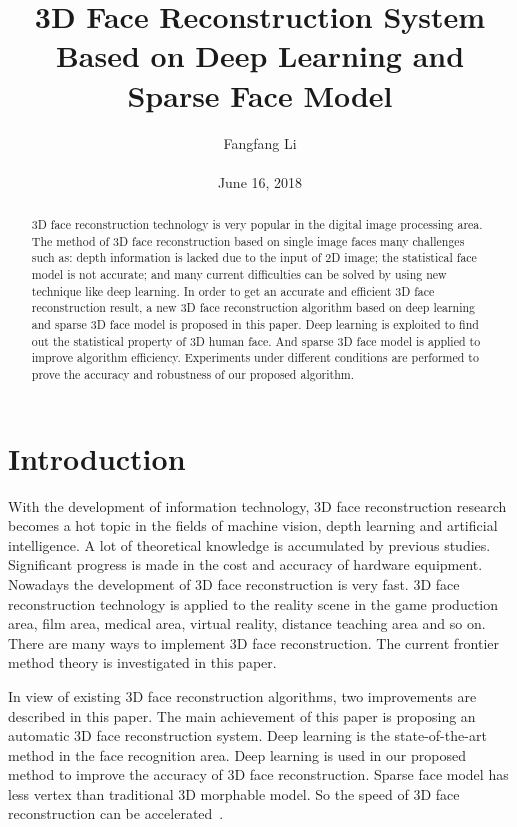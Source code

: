 \documentclass[10pt,twocolumn,letterpaper]{article}
\begin{document}
\title{\textbf{3D Face Reconstruction System Based on Deep Learning and Sparse Face Model }}
\author{Fangfang Li\\\\June 16, 2018}
\maketitle
\begin{abstract}
3D face reconstruction technology is very popular in the digital image processing area. The method of 3D face reconstruction based on single image faces many challenges such as: depth information is lacked due to the input of 2D image; the statistical face model is not accurate; and many current difficulties can be solved by using new technique like deep learning. In order to get an accurate and efficient 3D face reconstruction result, a new 3D face reconstruction algorithm based on deep learning and sparse 3D face model is proposed in this paper. Deep learning is exploited to find out the statistical property of 3D human face. And sparse 3D face model is applied to improve algorithm efficiency. Experiments under different conditions are performed to prove the accuracy and robustness of our proposed algorithm.
\end{abstract}
\section{Introduction}
With the development of information technology, 3D face reconstruction research becomes a hot topic in the fields of machine vision, depth learning and artificial intelligence. A lot of theoretical knowledge is accumulated by previous studies. Significant progress is made in the cost and accuracy of hardware equipment. Nowadays the development of 3D face reconstruction is very fast. 3D face reconstruction technology is applied to the reality scene in the game production area, film area, medical area, virtual reality, distance teaching area and so on. There are many ways to implement 3D face reconstruction. The current frontier method theory is investigated in this paper.

In view of existing 3D face reconstruction algorithms, two improvements are described in this paper. The main achievement of this paper is proposing an automatic 3D face reconstruction system. Deep learning is the state-of-the-art method in the face recognition area. Deep learning is used in  our proposed method to improve the accuracy of 3D face reconstruction. Sparse face model has less vertex than traditional 3D morphable model. So the speed of 3D face reconstruction can be accelerated~\cite{Kemelmachershlizerman2011Face}.
\end{document}
